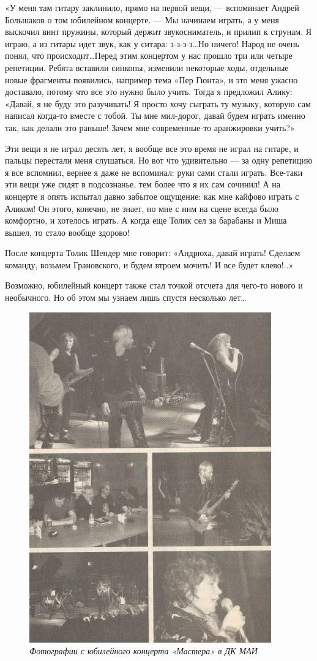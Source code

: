 \documentclass[16pt,a5paper,oneside]{book}
\begin{document}
«У меня там гитару заклинило, прямо на первой вещи, — вспоминает Андрей Большаков о том юбилейном концерте. — Мы
начинаем играть, а у меня выскочил винт пружины, который держит звукосниматель, и прилип к струнам. Я играю, а из гитары
идет звук, как у ситара: з-з-з-з\ldots Но ничего! Народ не очень понял, что происходит\ldots Перед этим концертом у нас
прошло три или четыре репетиции. Ребята вставили синкопы, изменили некоторые ходы, отдельные новые фрагменты появились,
например тема «Пер Гюнта», и это меня ужасно доставало, потому что все это нужно было учить. Тогда я предложил Алику:
«Давай, я не буду это разучивать! Я просто хочу сыграть ту музыку, которую сам написал когда-то вместе с тобой. Ты мне
мил-дорог, давай будем играть именно так, как делали это раньше! Зачем мне современные-то аранжировки учить?»

Эти вещи я не играл десять лет, я вообще все это время не играл на гитаре, и пальцы перестали меня слушаться. Но вот что
удивительно — за одну репетицию я все вспомнил, вернее я даже не вспоминал: руки сами стали играть. Все-таки эти вещи
уже сидят в подсознанье, тем более что я их сам сочинил! А на концерте я опять испытал давно забытое ощущение: как мне
кайфово играть с Аликом! Он этого, конечно, не знает, но мне с ним на сцене всегда было комфортно, и хотелось играть. А
когда еще Толик сел за барабаны и Миша вышел, то стало вообще здорово!

После концерта Толик Шендер мне говорит: «Андрюха, давай играть! Сделаем команду, возьмем Грановского, и будем втроем
мочить! И все будет клево!..»

Возможно, юбилейный концерт также стал точкой отсчета для чего-то нового и необычного. Но об этом мы узнаем лишь спустя
несколько лет\ldots

\begin{figure}
    \centering
    \includegraphics[scale=0.9]{Image37}
    \caption{\textit{Фотографии с юбилейного концерта «Мастера» в ДК МАИ}}
\end{figure}
\end{document}
